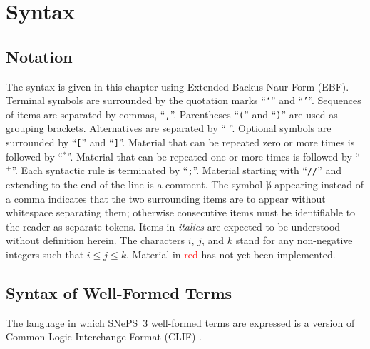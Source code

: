 \documentclass[letterpaper,colorlinks=true,linkcolor=blue]{book}
\begin{document}
\tableofcontents

\cleardoublepage
{}
\listoffigures

\mainmatter

\chapter{Syntax}
\section{Notation}
The syntax is given in this chapter using Extended Backus-Naur Form (EBF).
Terminal symbols are surrounded by the quotation marks ``\texttt{`}'' and
``\texttt{'}''.  Sequences of items are separated by commas, ``\texttt{,}''.
Parentheses ``\texttt{(}'' and ``\texttt{)}'' are used as grouping brackets.
Alternatives are separated by ``$\mid$''.  Optional symbols are surrounded by
``\texttt{[}'' and ``\texttt{]}''.  Material that can be repeated zero or more
times is followed by ``$^\ast$''.  Material that can be repeated one or more
times is followed by ``$^+$''.  Each syntactic rule is terminated by
``\texttt{;}''.  Material starting with ``\texttt{//}'' and extending to the end
of the line is a comment.  The symbol $\not b$ appearing instead of a comma
indicates that the two surrounding items are to appear without whitespace
separating them; otherwise consecutive items must be identifiable to the reader
as separate tokens.  Items in \textit{italics} are expected to be understood
without definition herein.  The characters $i$, $j$, and $k$ stand for any
non-negative integers such that $i \leq j \leq k$.  Material in
\textcolor{red}{red} has not yet been implemented.

\section{Syntax of Well-Formed Terms}
The language in which SNePS~3 well-formed terms are expressed is a version of
Common Logic Interchange Format (CLIF) \cite{ISO24707}.  
\end{document}
